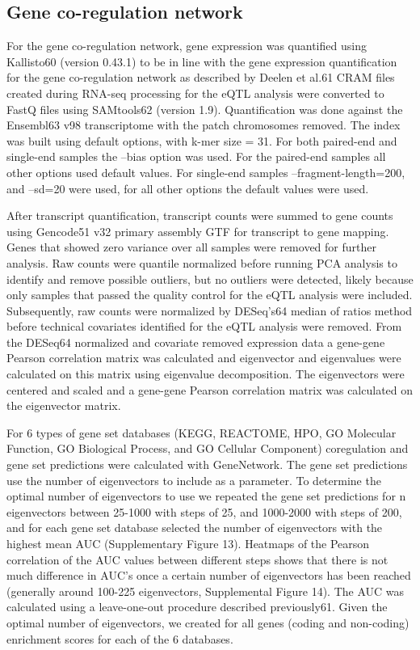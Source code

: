 \subsection{Gene co-regulation network}
For the gene co-regulation network, gene expression was quantified using Kallisto60 (version 0.43.1) to be in line with the gene expression quantification for the gene co-regulation network as described by Deelen et al.61  CRAM files created during RNA-seq processing for the eQTL analysis were converted to FastQ files using SAMtools62 (version 1.9). Quantification was done against the Ensembl63 v98 transcriptome with the patch chromosomes removed. The index was built using default options, with k-mer size = 31. For both paired-end and single-end samples the –bias option was used. For the paired-end samples all other options used default values. For single-end samples –fragment-length=200, and –sd=20 were used, for all other options the default values were used. 

After transcript quantification, transcript counts were summed to gene counts using Gencode51 v32 primary assembly GTF for transcript to gene mapping.  Genes that showed zero variance over all samples were removed for further analysis. Raw counts were quantile normalized before running PCA analysis to identify and remove possible outliers, but no outliers were detected, likely because only samples that passed the quality control for the eQTL analysis were included. Subsequently, raw counts were normalized by DESeq’s64 median of ratios method before technical covariates identified for the eQTL analysis were removed. From the DESeq64 normalized and covariate removed expression data a gene-gene Pearson correlation matrix was calculated and eigenvector and eigenvalues were calculated on this matrix using eigenvalue decomposition. The eigenvectors were centered and scaled and a gene-gene Pearson correlation matrix was calculated on the eigenvector matrix. 

For 6 types of gene set databases (KEGG, REACTOME, HPO, GO Molecular Function, GO Biological Process, and GO Cellular Component) coregulation and gene set predictions were calculated with GeneNetwork. The gene set predictions use the number of eigenvectors to include as a parameter. To determine the optimal number of eigenvectors to use we repeated the gene set predictions for n eigenvectors between 25-1000 with steps of 25, and 1000-2000 with steps of 200, and for each gene set database selected the number of eigenvectors with the highest mean AUC (Supplementary Figure 13). Heatmaps of the Pearson correlation of the AUC values between different steps shows that there is not much difference in AUC’s once a certain number of eigenvectors has been reached (generally around 100-225 eigenvectors, Supplemental Figure 14). The AUC was calculated using a leave-one-out procedure described previously61. Given the optimal number of eigenvectors, we created for all genes (coding and non-coding) enrichment scores for each of the 6 databases. 


